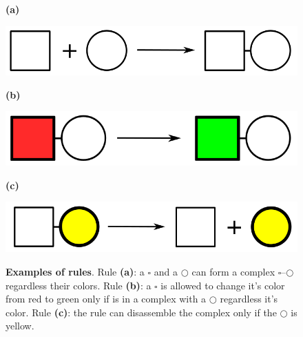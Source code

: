 \documentclass[12pt]{fithesis2}
\begin{document}
\begin{figure}[!h]
\begin{center}
\begin{minipage}[l]{0.1\textwidth}
    \textbf{(a)}
  \end{minipage}
  \begin{minipage}[r]{0.6\textwidth}
    {\hspace*{0.8cm}\includegraphics[scale=0.2]{pics/rule_complex}}
\end{minipage}

\begin{minipage}[l]{0.1\textwidth}
    \textbf{(b)}
  \end{minipage}
  \begin{minipage}[r]{0.6\textwidth}
    {\hspace*{1.35cm}\includegraphics[scale=0.2]{pics/rule_change}}
\end{minipage}

\begin{minipage}[l]{0.1\textwidth}
    \textbf{(c)}
  \end{minipage}
  \begin{minipage}[r]{0.6\textwidth}
    {\hspace*{1.3cm}\includegraphics[scale=0.2]{pics/rule_diss}}
\end{minipage}
\caption{\textbf{Examples of rules}. Rule \textbf{(a)}: a $\square$ and a $\bigcirc$ can form a complex $\square$--$\bigcirc$ regardless their colors. Rule \textbf{(b)}: a $\square$ is allowed to change it's color from red to green only if is in a complex with a $\bigcirc$ regardless it's color. Rule \textbf{(c)}: the rule can disassemble the complex only if the $\bigcirc$ is yellow.}
\label{rules:fig}
\end{center}
\end{figure}
\end{document}
